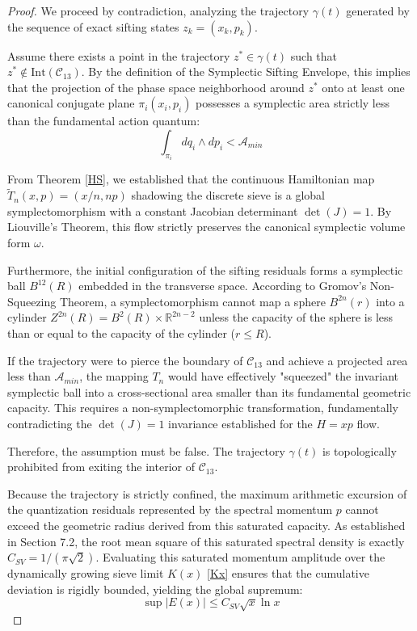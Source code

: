 \documentclass[sn-mathphys-num, pdflatex, referee]{sn-jnl}
\begin{document}
\begin{proof}
We proceed by contradiction, analyzing the trajectory $\gamma(t)$ generated by the sequence of exact sifting states $z_k = (x_k, p_k)$. 

Assume there exists a point in the trajectory $z^* \in \gamma(t)$ such that $z^* \notin \text{Int}(\mathcal{C}_{13})$. By the definition of the Symplectic Sifting Envelope, this implies that the projection of the phase space neighborhood around $z^*$ onto at least one canonical conjugate plane $\pi_i(x_i, p_i)$ possesses a symplectic area strictly less than the fundamental action quantum:
$$ \int_{\pi_i} dq_i \wedge dp_i < \mathcal{A}_{min} $$

From Theorem \ref{HS}, we established that the continuous Hamiltonian map $\tilde{T}_n(x,p) = (x/n, np)$ shadowing the discrete sieve is a global symplectomorphism with a constant Jacobian determinant $\det(J) = 1$. By Liouville's Theorem, this flow strictly preserves the canonical symplectic volume form $\omega$. 

Furthermore, the initial configuration of the sifting residuals forms a symplectic ball $B^{12}(R)$ embedded in the transverse space. According to Gromov's Non-Squeezing Theorem, a symplectomorphism cannot map a sphere $B^{2n}(r)$ into a cylinder $Z^{2n}(R) = B^2(R) \times \mathbb{R}^{2n-2}$ unless the capacity of the sphere is less than or equal to the capacity of the cylinder ($r \le R$).

If the trajectory were to pierce the boundary of $\mathcal{C}_{13}$ and achieve a projected area less than $\mathcal{A}_{min}$, the mapping $T_n$ would have effectively "squeezed" the invariant symplectic ball into a cross-sectional area smaller than its fundamental geometric capacity. This requires a non-symplectomorphic transformation, fundamentally contradicting the $\det(J) = 1$ invariance established for the $H=xp$ flow.

Therefore, the assumption must be false. The trajectory $\gamma(t)$ is topologically prohibited from exiting the interior of $\mathcal{C}_{13}$. 

Because the trajectory is strictly confined, the maximum arithmetic excursion of the quantization residuals represented by the spectral momentum $p$ cannot exceed the geometric radius derived from this saturated capacity. As established in Section 7.2, the root mean square of this saturated spectral density is exactly $C_{SV} = 1/(\pi\sqrt{2})$. Evaluating this saturated momentum amplitude over the dynamically growing sieve limit $K(x)$ \ref{Kx} ensures that the cumulative deviation is rigidly bounded, yielding the global supremum:
$$ \sup |E(x)| \le C_{SV} \sqrt{x} \ln x $$
\end{proof}
\end{document}
